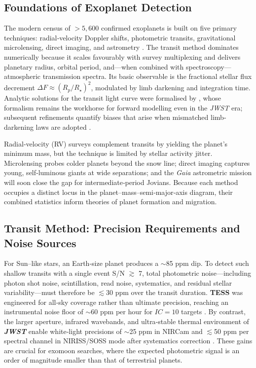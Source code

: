 \documentclass[11pt]{article}
\begin{document}
\subsection{Foundations of Exoplanet Detection}
The modern census of $>5{,}600$ confirmed exoplanets is built on five primary techniques: radial‐velocity Doppler shifts, photometric transits, gravitational microlensing, direct imaging, and astrometry \citep{exodetect24}.  
The transit method dominates numerically because it scales favourably with survey multiplexing and delivers planetary radius, orbital period, and—when combined with spectroscopy—atmospheric transmission spectra.  
Its basic observable is the fractional stellar flux decrement
$\Delta F \!\approx\! (R_p/R_\star)^2$,  
modulated by limb darkening and integration time.  
Analytic solutions for the transit light curve were formalised by \citet{mandelagol02}, whose formalism remains the workhorse for forward modelling even in the \textit{JWST} era; subsequent refinements quantify biases that arise when mismatched limb‐darkening laws are adopted \citep{moreldark22}.  

Radial‐velocity (RV) surveys complement transits by yielding the planet’s minimum mass, but the technique is limited by stellar activity jitter.  
Microlensing probes colder planets beyond the snow line; direct imaging captures young, self‐luminous giants at wide separations; and the \textit{Gaia} astrometric mission will soon close the gap for intermediate‐period Jovians.  
Because each method occupies a distinct locus in the planet–mass–semi‐major‐axis diagram, their combined statistics inform theories of planet formation and migration.

\subsection{Transit Method: Precision Requirements and Noise Sources}
For Sun–like stars, an Earth‐size planet produces a $\sim$85 ppm dip.  
To detect such shallow transits with a single event S/N $\gtrsim$ 7, total photometric noise—including photon shot noise, scintillation, read noise, systematics, and residual stellar variability—must therefore be $\lesssim$30 ppm over the transit duration.  
\textbf{TESS} was engineered for all‐sky coverage rather than ultimate precision, reaching an instrumental noise floor of $\sim$60 ppm per hour for $I\!C{=}10$ targets \citep{tesshandbook18}.  
By contrast, the larger aperture, infrared wavebands, and ultra‐stable thermal environment of \textbf{\textit{JWST}} enable white‐light precisions of $\sim$25 ppm in NIRCam and $\lesssim$50 ppm per spectral channel in NIRISS/SOSS mode after systematics correction \citep{jwstniriss23,jwstplanetology19}.  
These gains are crucial for exomoon searches, where the expected photometric signal is an order of magnitude smaller than that of terrestrial planets.
\end{document}
